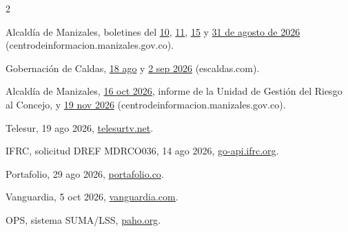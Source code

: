 \documentclass[11pt,letterpaper,parskip=half-]{scrartcl}
\begin{document}
{\begin{multicols}{2}
\begin{enumerate}[label={[\arabic*]}, ref={\arabic*}, leftmargin=2.2em, itemsep=0pt]
\item\label{f:alcago} Alcaldía de Manizales, boletines del \href{https://centrodeinformacion.manizales.gov.co/comunicado-de-prensa-sobre-no-llevar-alimentos-a-los-albergues-por-ahora/}{10}, \href{https://centrodeinformacion.manizales.gov.co/comunicado-de-prensa-sobre-manizales-fortalece-la-atencion-a-las-familias-afectadas-por-el-sismo-en-el-coliseo-mayor-jorge-arango-uribe/}{11}, \href{https://centrodeinformacion.manizales.gov.co/carpas-de-atencion-cable-aereo-y-linea-de-atencion/}{15} y \href{https://centrodeinformacion.manizales.gov.co/alcaldia-ugr-y-cruz-roja-intensifican-entrega-de-auxilios-y-alimentos-a-familias-damnificadas-por-el-sismo/}{31 de agosto de 2026} (centrodeinformacion.manizales.gov.co).
\item\label{f:gob} Gobernación de Caldas, \href{https://escaldas.com/mas-de-8-200-kits-de-ayuda-humanitaria-han-sido-entregados-a-municipios-de-caldas-tras-el-terremoto-del-10-de-agosto/}{18 ago} y \href{https://escaldas.com/gobierno-de-caldas-ha-movilizado-esta-semana-al-menos-6-800-ayudas-humanitarias-ya-completa-mas-de-18-000-entregas-tras-el-sismo/}{2 sep 2026} (escaldas.com).
\item\label{f:alcnov} Alcaldía de Manizales, \href{https://centrodeinformacion.manizales.gov.co/manizales-presento-informe-al-concejo-de-las-acciones-adelantadas-tras-sismo-del-10-de-agosto/}{16 oct 2026}, informe de la Unidad de Gestión del Riesgo al Concejo, y \href{https://centrodeinformacion.manizales.gov.co/manizales-continua-con-los-aportes-para-la-recuperacion-patrimonial-a-propietarios-de-viviendas-y-comerciantes-afectados-por-el-sismo/}{19 nov 2026} (centrodeinformacion.manizales.gov.co).
\item\label{f:pma} Telesur, 19 ago 2026, \href{https://www.telesurtv.net/colombia-onu-asistencia-100000-personas/}{telesurtv.net}.
\item\label{f:dref} IFRC, solicitud DREF MDRCO036, 14 ago 2026, \href{https://go-api.ifrc.org/api/DownloadFile/96426/MDRCO036do}{go-api.ifrc.org}.
\item\label{f:rud} Portafolio, 29 ago 2026, \href{https://www.portafolio.co/economia/gobierno/declaratoria-de-desastre-nacional-por-terremoto-que-cambia-para-colombia-y-como-operara-la-ayuda-501440}{portafolio.co}.
\item\label{f:vanguardia} Vanguardia, 5 oct 2026, \href{https://www.vanguardia.com/colombia/2026/10/05/procuraduria-pide-a-la-ungrd-agilizar-ayudas-para-damnificados-por-el-terremoto/}{vanguardia.com}.
\item\label{f:suma} OPS, sistema SUMA/LSS, \href{https://www.paho.org/es/temas/respuesta-emergencias-salud-desastres/sistema-lss}{paho.org}.

\end{enumerate}
\end{multicols}}
\end{document}
